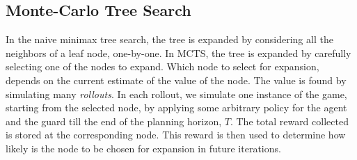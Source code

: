 \documentclass[10 pt, conference]{ieeeconf}
\newcommand{\pcomment}{\textcolor{red}}%
\begin{document}

\subsection{Monte-Carlo Tree Search}
In the naive minimax tree search, the tree is expanded by considering all the neighbors of a leaf node, one-by-one. In MCTS, the tree is expanded by carefully selecting one of the nodes to expand. Which node to select for expansion, depends on the current estimate of the value of the node. The value is found by simulating many \emph{rollouts}. In each rollout, we simulate one instance of the game, starting from the selected node, by applying some arbitrary policy for the agent and the guard till the end of the planning horizon, $T$. The total reward collected is stored at the corresponding node. This reward is then used to determine how likely is the node to be chosen for expansion in future iterations. 

\begin{figure}[H]
\end{figure}
\end{document}
